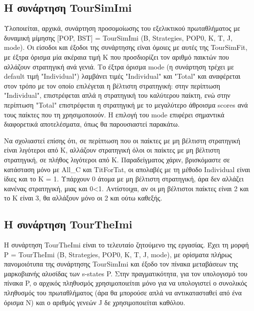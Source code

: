 \documentclass[12pt]{article}
\begin{document}
\subsection{Η συνάρτηση TourSimImi}
Υλοποιείται, αρχικά, συνάρτηση προσομοίωσης του εξελικτικού πρωταθλήματος με δυναμική μίμησης [POP, BST]\- =\- TourSimImi\- (B,\- Strategies,\- POP0,\- K,\- T, \-J, \- mode). Οι είσοδοι και έξοδοι της συνάρτησης είναι όμοιες με αυτές της TourSimFit, με έξτρα όρισμα μία ακέραια τιμή K που προσδιορίζει τον αριθμό παικτών που αλλάζουν στρατηγική ανά γενιά. Το έξτρα όρισμα mode (η συνάρτηση τρέχει με default τιμή "Individual") λαμβάνει τιμές "Individual" και "Total" και αναφέρεται στον τρόπο με τον οποίο επιλέγεται η βέλτιστη στρατηγική: στην περίπτωση "Individual", επιστρέφεται απλά η στρατηγική του καλύτερου παίκτη, ενώ στην περίπτωση "Total" επιστρέφεται η στρατηγική με το μεγαλύτερο άθροισμα scores ανά τους παίκτες που τη χρησιμοποιούν. Η επιλογή του mode επιφέρει σημαντικά διαφορετικά αποτελέσματα, όπως θα παρουσιαστεί παρακάτω.

Να σχολιαστεί επίσης ότι, σε περίπτωση που οι παίκτες με μη βέλτιστη στρατηγική είναι λιγότεροι από K, αλλάζουν στρατηγική όλοι οι παίκτες με μη βέλτιστη στρατηγική, σε πλήθος λιγότεροι από K. Παραδείγματος χάριν, βρισκόμαστε σε κατάσταση μόνο με All\_C και TitForTat, οι απολαβές με τη μέθοδο Individual είναι ίδιες και το K = 1. Υπάρχουν 0 άτομα με μη βέλτιστη στρατηγική, άρα δεν αλλάζει κανένας στρατηγική, μιας και 0<1. Αντίστοιχα, αν οι μη βέλτιστοι παίκτες είναι 2 και το K είναι 3, θα αλλάξουν μόνο οι 2 και ούτω καθεξής.

\subsection{Η συνάρτηση TourTheImi}
Η συνάρτηση TourTheImi είναι το τελευταίο ζητούμενο της εργασίας. Έχει τη μορφή P\- =\- TourTheImi\- (B,\- Strategies,\- POP0,\- K,\- T,\- J,\- mode), με ορίσματα πλήρως πανομοιότυπα της συνάρτησης TourSimImi και έξοδο τον πίνακα μεταβάσεων της μαρκοβιανής αλυσίδας των s-states P. Στην πραγματικότητα, για τον υπολογισμό του πίνακα P, ο αρχικός πληθυσμός χρησιμοποιείται μόνο για να υπολογιστεί ο συνολικός πληθυσμός του πρωταθλήματος (άρα θα μπορούσε απλά να αντικατασταθεί από ένα όρισμα N) και ο αριθμός γενεών J δε χρησιμοποιείται καθόλου.
\end{document}
